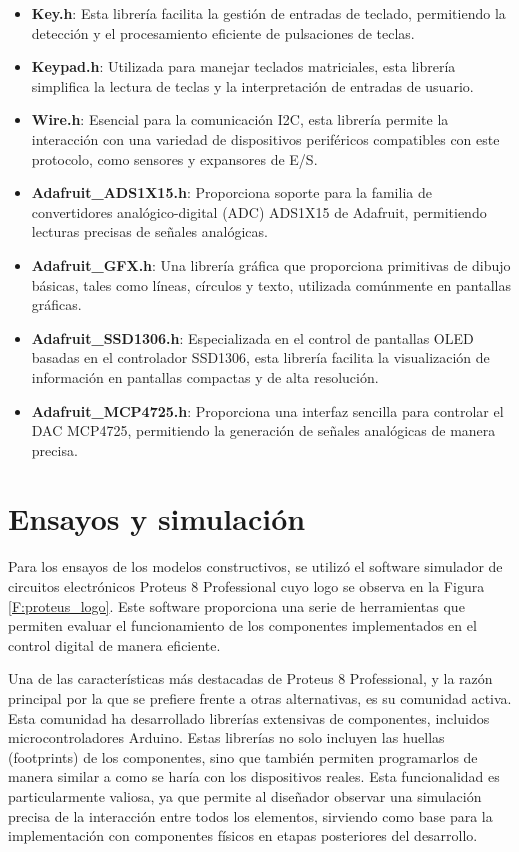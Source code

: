 \begin{itemize}
    \item \textbf{Key.h}: Esta librería facilita la gestión de entradas de teclado, permitiendo la detección y el procesamiento eficiente de pulsaciones de teclas.
    \item \textbf{Keypad.h}: Utilizada para manejar teclados matriciales, esta librería simplifica la lectura de teclas y la interpretación de entradas de usuario.
    \item \textbf{Wire.h}: Esencial para la comunicación I2C, esta librería permite la interacción con una variedad de dispositivos periféricos compatibles con este protocolo, como sensores y expansores de E/S.
    \item \textbf{Adafruit\_ADS1X15.h}: Proporciona soporte para la familia de convertidores analógico-digital (ADC) ADS1X15 de Adafruit, permitiendo lecturas precisas de señales analógicas.
    \item \textbf{Adafruit\_GFX.h}: Una librería gráfica que proporciona primitivas de dibujo básicas, tales como líneas, círculos y texto, utilizada comúnmente en pantallas gráficas.
    \item \textbf{Adafruit\_SSD1306.h}: Especializada en el control de pantallas OLED basadas en el controlador SSD1306, esta librería facilita la visualización de información en pantallas compactas y de alta resolución.
    \item \textbf{Adafruit\_MCP4725.h}: Proporciona una interfaz sencilla para controlar el DAC MCP4725, permitiendo la generación de señales analógicas de manera precisa.
\end{itemize}

\section{Ensayos y simulación}
Para los ensayos de los modelos constructivos, se utilizó el software simulador de circuitos electrónicos Proteus 8 Professional cuyo logo se observa en la Figura \ref{F:proteus_logo}. Este software proporciona una serie de herramientas que permiten evaluar el funcionamiento de los componentes implementados en el control digital de manera eficiente. \par 
Una de las características más destacadas de Proteus 8 Professional, y la razón principal por la que se prefiere frente a otras alternativas, es su comunidad activa. Esta comunidad ha desarrollado librerías extensivas de componentes, incluidos microcontroladores Arduino. Estas librerías no solo incluyen las huellas (footprints) de los componentes, sino que también permiten programarlos de manera similar a como se haría con los dispositivos reales. Esta funcionalidad es particularmente valiosa, ya que permite al diseñador observar una simulación precisa de la interacción entre todos los elementos, sirviendo como base para la implementación con componentes físicos en etapas posteriores del desarrollo.

